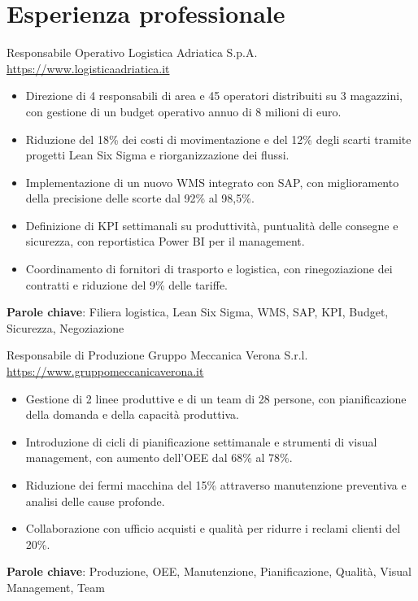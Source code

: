 \documentclass[a4paper, serif, 10pt]{moderncv}
\begin{document}
\section{Esperienza professionale}

        {Responsabile Operativo}
        {Logistica Adriatica S.p.A.}
        {\url{https://www.logisticaadriatica.it}}
        {}
        {\begin{itemize}
\item Direzione di 4 responsabili di area e 45 operatori distribuiti su 3 magazzini, con gestione di un budget operativo annuo di 8 milioni di euro.
\item Riduzione del 18\% dei costi di movimentazione e del 12\% degli scarti tramite progetti Lean Six Sigma e riorganizzazione dei flussi.
\item Implementazione di un nuovo WMS integrato con SAP, con miglioramento della precisione delle scorte dal 92\% al 98,5\%.
\item Definizione di KPI settimanali su produttività, puntualità delle consegne e sicurezza, con reportistica Power BI per il management.
\item Coordinamento di fornitori di trasporto e logistica, con rinegoziazione dei contratti e riduzione del 9\% delle tariffe.
\end{itemize}
\textbf{Parole chiave}: Filiera logistica, Lean Six Sigma, WMS, SAP, KPI, Budget, Sicurezza, Negoziazione}

        {Responsabile di Produzione}
        {Gruppo Meccanica Verona S.r.l.}
        {\url{https://www.gruppomeccanicaverona.it}}
        {}
        {\begin{itemize}
\item Gestione di 2 linee produttive e di un team di 28 persone, con pianificazione della domanda e della capacità produttiva.
\item Introduzione di cicli di pianificazione settimanale e strumenti di visual management, con aumento dell'OEE dal 68\% al 78\%.
\item Riduzione dei fermi macchina del 15\% attraverso manutenzione preventiva e analisi delle cause profonde.
\item Collaborazione con ufficio acquisti e qualità per ridurre i reclami clienti del 20\%.
\end{itemize}
\textbf{Parole chiave}: Produzione, OEE, Manutenzione, Pianificazione, Qualità, Visual Management, Team}
\end{document}
